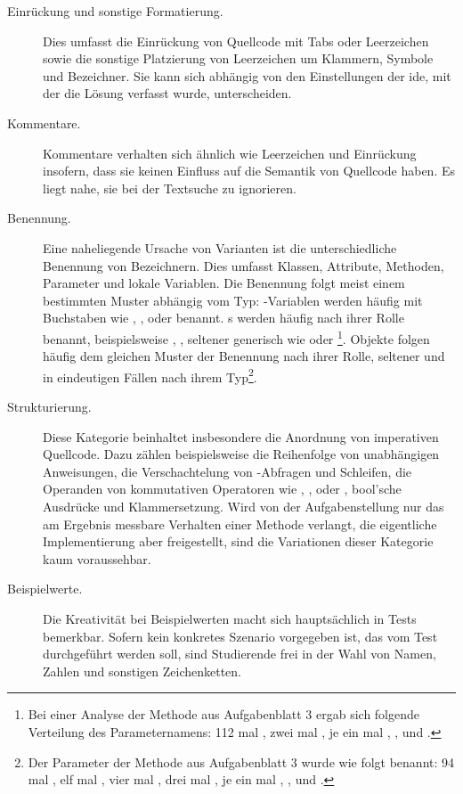 \begin{description}
    \item[Einrückung und sonstige Formatierung.]
    Dies umfasst die Einrückung von Quellcode mit Tabs oder Leerzeichen sowie die sonstige Platzierung von Leerzeichen um Klammern, Symbole und Bezeichner.
    Sie kann sich abhängig von den Einstellungen der \ac{ide}, mit der die Lösung verfasst wurde, unterscheiden.
    \item[Kommentare.]
    Kommentare verhalten sich ähnlich wie Leerzeichen und Einrückung insofern, dass sie keinen Einfluss auf die Semantik von Quellcode haben.
    Es liegt nahe, sie bei der Textsuche zu ignorieren.
    \item[Benennung.]
    Eine naheliegende Ursache von Varianten ist die unterschiedliche Benennung von Bezeichnern.
    Dies umfasst Klassen, Attribute, Methoden, Parameter und lokale Variablen.
    Die Benennung folgt meist einem bestimmten Muster abhängig vom Typ:
    -Variablen werden häufig mit Buchstaben wie , ,  oder  benannt.
    s werden häufig nach ihrer Rolle benannt, beispielsweise , , seltener generisch wie  oder \footnote{
        Bei einer Analyse der Methode  aus Aufgabenblatt 3 ergab sich folgende Verteilung des Parameternamens:
        112 mal , zwei mal , je ein mal , \sic,  und .\label{fn:setPhase}
    }.
    Objekte folgen häufig dem gleichen Muster der Benennung nach ihrer Rolle, seltener und in eindeutigen Fällen nach ihrem Typ\footnote{
        Der Parameter der Methode  aus Aufgabenblatt 3 wurde wie folgt benannt:
        94 mal , elf mal , vier mal , drei mal , je ein mal , , \sic und .\label{fn:setWinner}
    }.
    \item[Strukturierung.]
    Diese Kategorie beinhaltet insbesondere die Anordnung von imperativen Quellcode.
    Dazu zählen beispielsweise die Reihenfolge von unabhängigen Anweisungen, die Verschachtelung von -Abfragen und Schleifen, die Operanden von kommutativen Operatoren wie \code{+}, \code{*}, \code{&&} oder \code{||}, bool'sche Ausdrücke und Klammersetzung.
    Wird von der Aufgabenstellung nur das am Ergebnis messbare Verhalten einer Methode verlangt, die eigentliche Implementierung aber freigestellt, sind die Variationen dieser Kategorie kaum voraussehbar.
    \item[Beispielwerte.]
    Die Kreativität bei Beispielwerten macht sich hauptsächlich in Tests bemerkbar.
    Sofern kein konkretes Szenario vorgegeben ist, das vom Test durchgeführt werden soll, sind Studierende frei in der Wahl von Namen, Zahlen und sonstigen Zeichenketten.
\end{description}

